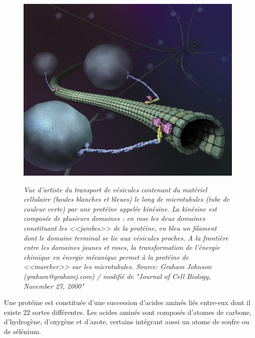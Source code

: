 \begin{figure}[h]
  \centering
  {\includegraphics[width=0.75\linewidth]{./figures/ch1/kinesincargoart}}
    \caption[Vue d'artiste du transport de vésicules le long de microtubules]{\it Vue d’artiste du transport de vésicules contenant du matériel cellulaire (boules blanches et bleues) le long de microtubules (tube de couleur verte) par une protéine appelée kinésine. La kinésine est composée de plusieurs domaines : en rose les deux domaines constituant les <<jambes>> de la protéine, en bleu un filament dont le domaine terminal se lie aux vésicules proches. A la frontière entre les domaines jaunes et roses, la transformation de l'énergie chimique en énergie mécanique permet à la protéine de <<marcher>> sur les microtubules. Source: Graham Johnson (graham@grahamj.com) / modifié de "Journal of Cell Biology, November 27, 2000"}
    \label{Fig:kinesincargoart}

\end{figure}


Une protéine est constituée d'une succession d'acides aminés liés entre-eux dont il existe 22 sortes différentes. Les acides aminés sont composés d'atomes de carbone, d'hydrogène, d'oxygène et d'azote, certains intégrant aussi un atome de soufre ou de sélénium.


